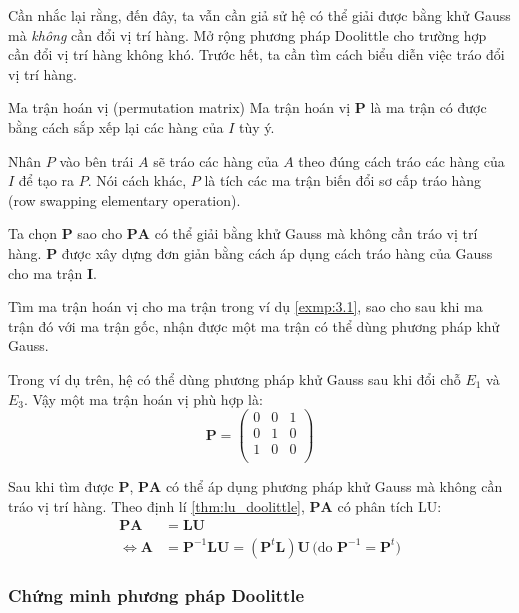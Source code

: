 \documentclass[../../Lectures]{subfiles}
\begin{document}
Cần nhắc lại rằng, đến đây, ta vẫn cần giả sử hệ có thể giải được bằng khử Gauss
mà \emph{không} cần đổi vị trí hàng. Mở rộng phương pháp Doolittle cho trường
hợp cần đổi vị trí hàng không khó. Trước hết, ta cần tìm cách biểu diễn việc
tráo đổi vị trí hàng.

\begin{cdefinition}{Ma trận hoán vị (permutation matrix)}{}
    Ma trận hoán vị \(\bm{P}\) là ma trận có được bằng cách sắp xếp lại các hàng
    của \(I\) tùy ý.
\end{cdefinition}

Nhân \(P\) vào bên trái \(A\) sẽ tráo các hàng của \(A\) theo đúng cách tráo các
hàng của \(I\) để tạo ra \(P\). Nói cách khác, \(P\) là tích các ma trận biến
đổi sơ cấp tráo hàng (row swapping elementary operation).

Ta chọn \(\bm{P}\) sao cho \(\bm{PA}\) có thể giải bằng khử Gauss mà không cần
tráo vị trí hàng. \(\bm{P}\) được xây dựng đơn giản bằng cách áp dụng cách tráo
hàng của Gauss cho ma trận \(\bm{I}\).

\begin{exmp}
    Tìm ma trận hoán vị cho ma trận trong ví dụ \ref{exmp:3.1}, sao cho sau khi
    ma trận đó với ma trận gốc, nhận được một ma trận có thể dùng phương pháp
    khử Gauss.

    Trong ví dụ trên, hệ có thể dùng phương pháp khử Gauss sau khi đổi chỗ
    \(E_1\) và \(E_3\). Vậy một ma trận hoán vị phù hợp là:
    \[
        \bm{P} =
            \begin{pmatrix}
                0  &  0  &  1  \\
                0  &  1  &  0  \\
                1  &  0  &  0  \\
            \end{pmatrix}
    \]
\end{exmp}

Sau khi tìm được \(\bm{P}\), \(\bm{PA}\) có thể áp dụng phương pháp khử Gauss mà
không cần tráo vị trí hàng. Theo định lí \ref{thm:lu_doolittle}, \(\bm{PA}\) có
phân tích LU:
\begin{align*}
        \bm{PA} &= \bm{LU} \\
    \iff \bm{A} &= \bm{P}^{-1} \bm{LU} = (\bm{P}^t \bm{L}) \bm{U} \, \text{(do \(\bm{P}^{-1} = \bm{P}^t\))}
\end{align*}

\subsubsection{Chứng minh phương pháp Doolittle}
\end{document}

